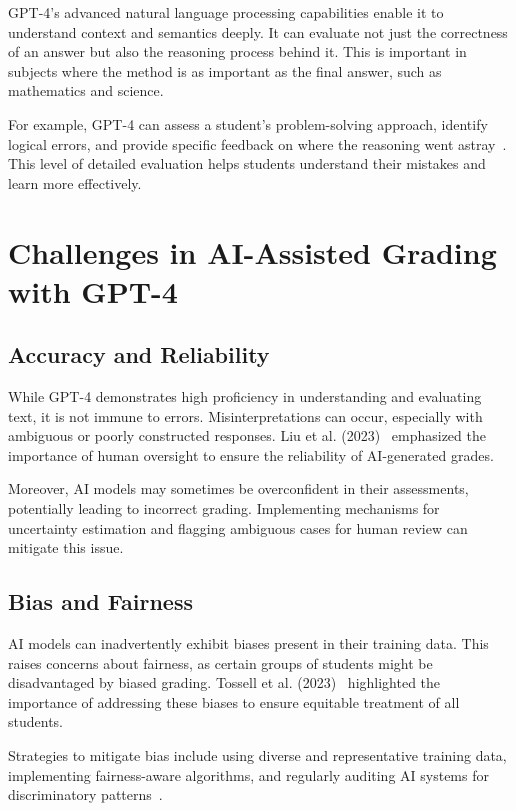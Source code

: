\documentclass[ms,twoside,print]{nuthesis}
\begin{document}
GPT-4's advanced natural language processing capabilities enable it to understand context and semantics deeply. It can evaluate not just the correctness of an answer but also the reasoning process behind it. This is important in subjects where the method is as important as the final answer, such as mathematics and science.

For example, GPT-4 can assess a student's problem-solving approach, identify logical errors, and provide specific feedback on where the reasoning went astray~\cite{Alto2023}. This level of detailed evaluation helps students understand their mistakes and learn more effectively.

\section{Challenges in AI-Assisted Grading with GPT-4}

\subsection{Accuracy and Reliability}

While GPT-4 demonstrates high proficiency in understanding and evaluating text, it is not immune to errors. Misinterpretations can occur, especially with ambiguous or poorly constructed responses. Liu et al. (2023)~\cite{Liu2023} emphasized the importance of human oversight to ensure the reliability of AI-generated grades.

Moreover, AI models may sometimes be overconfident in their assessments, potentially leading to incorrect grading. Implementing mechanisms for uncertainty estimation and flagging ambiguous cases for human review can mitigate this issue.

\subsection{Bias and Fairness}

AI models can inadvertently exhibit biases present in their training data. This raises concerns about fairness, as certain groups of students might be disadvantaged by biased grading. Tossell et al. (2023)~\cite{Tossell2023} highlighted the importance of addressing these biases to ensure equitable treatment of all students.

Strategies to mitigate bias include using diverse and representative training data, implementing fairness-aware algorithms, and regularly auditing AI systems for discriminatory patterns~\cite{Mehrabi2021}.
\end{document}
